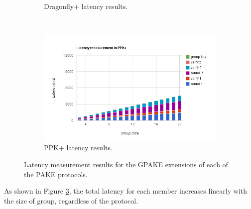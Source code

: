 \begin{figure}[h]
\begin{subfigure}[b]{0.5\textwidth}
        \caption{Dragonfly+ latency results.}
        \label{fig:dragon_results}
    \end{subfigure}
    ~
    \begin{subfigure}[b]{0.5\textwidth}
        \centering
        \includegraphics[width=\textwidth]{benchmark/scale_ppk.png}
        \caption{PPK+ latency results.}
        \label{fig:ppk_results}
    \end{subfigure}
    \caption{Latency measurement results for the GPAKE extensions of each of the PAKE protocols.}
    \label{fig:results}
\end{figure}


As shown in Figure \ref{fig:results}, the total latency for each member increases linearly with the size of group, regardless of the protocol.

